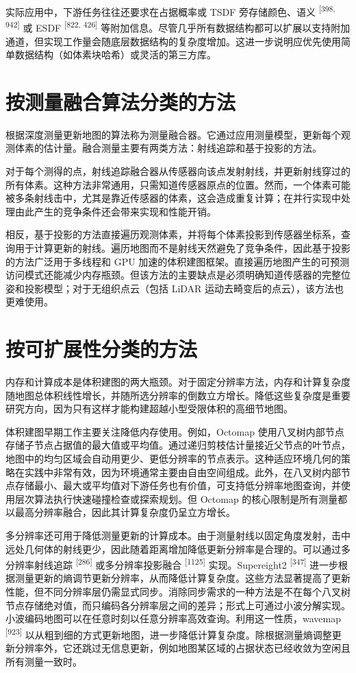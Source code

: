 实际应用中，下游任务往往还要求在占据概率或 TSDF 旁存储颜色、语义 \textsuperscript{[398, 942]} 或 ESDF \textsuperscript{[822, 426]} 等附加信息。尽管几乎所有数据结构都可以扩展以支持附加通道，但实现工作量会随底层数据结构的复杂度增加。这进一步说明应优先使用简单数据结构（如体素块哈希）或灵活的第三方库。

\section{按测量融合算法分类的方法}

根据深度测量更新地图的算法称为测量融合器。它通过应用测量模型，更新每个观测体素的估计量。融合测量主要有两类方法：射线追踪和基于投影的方法。

对于每个测得的点，射线追踪融合器从传感器向该点发射射线，并更新射线穿过的所有体素。这种方法非常通用，只需知道传感器原点的位置。然而，一个体素可能被多条射线击中，尤其是靠近传感器的体素，这会造成重复计算；在并行实现中处理由此产生的竞争条件还会带来实现和性能开销。

相反，基于投影的方法直接遍历观测体素，并将每个体素投影到传感器坐标系，查询用于计算更新的射线。遍历地图而不是射线天然避免了竞争条件，因此基于投影的方法广泛用于多线程和 GPU 加速的体积建图框架。直接遍历地图产生的可预测访问模式还能减少内存瓶颈。但该方法的主要缺点是必须明确知道传感器的完整位姿和投影模型；对于无组织点云（包括 LiDAR 运动去畸变后的点云），该方法也更难使用。

\section{按可扩展性分类的方法}

内存和计算成本是体积建图的两大瓶颈。对于固定分辨率方法，内存和计算复杂度随地图总体积线性增长，并随所选分辨率的倒数立方增长。降低这些复杂度是重要研究方向，因为只有这样才能构建超越小型受限体积的高细节地图。

体积建图早期工作主要关注降低内存使用。例如，Octomap 使用八叉树内部节点存储子节点占据值的最大值或平均值。通过递归剪枝估计量接近父节点的叶节点，地图中的均匀区域会自动用更少、更低分辨率的节点表示。这种适应环境几何的策略在实践中非常有效，因为环境通常主要由自由空间组成。此外，在八叉树内部节点存储最小、最大或平均值对下游任务也有价值，可支持低分辨率地图查询，并使用层次算法执行快速碰撞检查或探索规划。但 Octomap 的核心限制是所有测量都以最高分辨率融合，因此其计算复杂度仍呈立方增长。

多分辨率还可用于降低测量更新的计算成本。由于测量射线以固定角度发射，击中远处几何体的射线更少，因此随着距离增加降低更新分辨率是合理的。可以通过多分辨率射线追踪 \textsuperscript{[286]} 或多分辨率投影融合 \textsuperscript{[1125]} 实现。Supereight2 \textsuperscript{[347]} 进一步根据测量更新的熵调节更新分辨率，从而降低计算复杂度。这些方法显著提高了更新性能，但不同分辨率层仍需显式同步。消除同步需求的一种方法是不在每个八叉树节点存储绝对值，而只编码各分辨率层之间的差异；形式上可通过小波分解实现。小波编码地图可以在任意时刻以任意分辨率高效查询。利用这一性质，wavemap \textsuperscript{[923]} 以从粗到细的方式更新地图，进一步降低计算复杂度。除根据测量熵调整更新分辨率外，它还跳过无信息更新，例如地图某区域的占据状态已经收敛为空闲且所有测量一致时。

